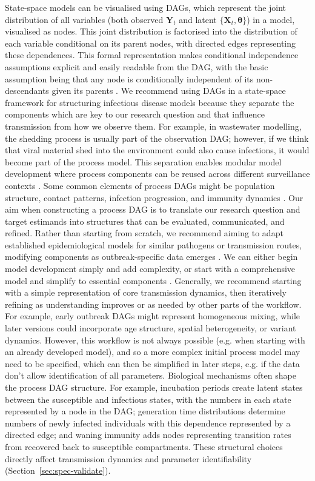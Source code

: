 \documentclass{article}
\begin{document}
State-space models can be visualised using \ac{DAG}s, which represent the joint distribution of all variables (both observed $\boldsymbol{Y}_t$ and latent $\{\boldsymbol{X}_t, \boldsymbol{\theta}\}$) in a model, visualised as nodes. This joint distribution is factorised into the distribution of each variable conditional on its parent nodes, with directed edges representing these dependences. This formal representation makes conditional independence assumptions explicit and easily readable from the \ac{DAG}, with the basic assumption being that any node is conditionally independent of its non-descendants given its parents \citep{lauritzen1996graphical}. We recommend using \ac{DAG}s in a state-space framework for structuring infectious disease models because they separate the components which are key to our research question and that influence transmission from how we observe them. 
For example, in wastewater modelling, the shedding process is usually part of the observation \ac{DAG}; however, if we think that viral material shed into the environment could also cause infections, it would become part of the process model.
This separation enables modular model development where process components can be reused across different surveillance contexts \citep{nicholson2022interoperability}.
Some common elements of process \ac{DAG}s might be population structure, contact patterns, infection progression, and immunity dynamics \citep{deangelis2018analysing}. 
Our aim when constructing a process \ac{DAG} is to translate our research question and target estimands into structures that can be evaluated, communicated, and refined.
Rather than starting from scratch, we recommend aiming to adapt established epidemiological models for similar pathogens or transmission routes, modifying components as outbreak-specific data emerges \citep{gelman2020bayesian}.
We can either begin model development simply and add complexity, or start with a comprehensive model and simplify to essential components \citep{gelman2020bayesian}.
Generally, we recommend starting with a simple representation of core transmission dynamics, then iteratively refining as understanding improves or as needed by other parts of the workflow.
For example, early outbreak \ac{DAG}s might represent homogeneous mixing, while later versions could incorporate age structure, spatial heterogeneity, or variant dynamics.
However, this workflow is not always possible (e.g. when starting with an already developed model), and so a more complex initial process model may need to be specified, which can then be simplified in later steps, e.g. if the data don't allow identification of all parameters.
Biological mechanisms often shape the process \ac{DAG} structure. For example, incubation periods create latent states between the susceptible and infectious states, with the numbers in each state represented by a node in the \ac{DAG}; generation time distributions determine numbers of newly infected individuals with this dependence represented by a directed edge; and waning immunity adds nodes representing transition rates from recovered back to susceptible compartments.
These structural choices directly affect transmission dynamics and parameter identifiability (Section~\ref{sec:spec-validate}).
\end{document}
